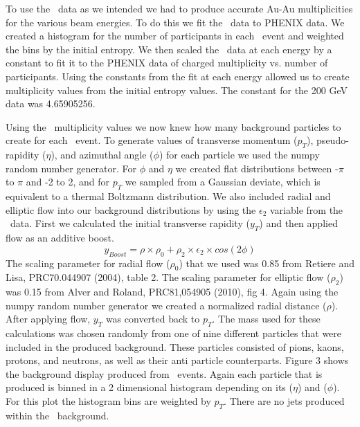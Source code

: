 \documentclass[11pt]{article}
\begin{document}
To use the \trento\ data as we intended we had to produce accurate Au-Au multiplicities for the various beam energies. To do this we fit the \trento\ data to PHENIX data. We created a histogram for the number of participants in each \trento\ event and weighted the bins by the initial entropy. We then scaled the \trento\ data at each energy by a constant to fit it to the PHENIX data of charged multiplicity vs. number of participants. Using the constants from the fit at each energy allowed us to create multiplicity values from the initial entropy values. The constant for the 200 GeV data was 4.65905256.

Using the \trento\ multiplicity values we now knew how many background particles to create for each \trento\ event. To generate values of transverse momentum ($p_T$), pseudo-rapidity ($\eta$), and azimuthal angle ($\phi$) for each particle we used the numpy random number generator. For $\phi$  and $\eta$ we created flat distributions between -$\pi$ to $\pi$ and -2 to 2, and for $p_T$ we sampled from a Gaussian deviate, which is equivalent to a thermal Boltzmann distribution. We also included radial and elliptic flow into our background distributions by using the $\epsilon_2$ variable from the \trento\ data. First we calculated the initial transverse rapidity ($y_T$) and then applied flow as an additive boost. 
\[y_{Boost} = \rho \times \rho_0 + \rho_2 \times \epsilon_2 \times cos(2\phi)\]
The scaling parameter for radial flow ($\rho_0$) that we used was 0.85 from Retiere and Lisa, PRC70.044907 (2004), table 2.  The scaling parameter for elliptic flow ($\rho_2$) was 0.15 from Alver and Roland, PRC81,054905 (2010), fig 4. Again using the numpy random number generator we created a normalized radial distance ($\rho$). After applying flow, $y_T$ was converted back to $p_T$. The mass used for these calculations was chosen randomly from one of nine different particles that were included in the produced background. These particles consisted of pions, kaons, protons, and neutrons, as well as their anti particle counterparts. Figure 3 shows the background display produced from \trento\ events. Again each particle that is produced is binned in a 2 dimensional histogram depending on its ($\eta$) and ($\phi$). For this plot the histogram bins are weighted by $p_T$. There are no jets produced within the \trento\ background.
\end{document}
